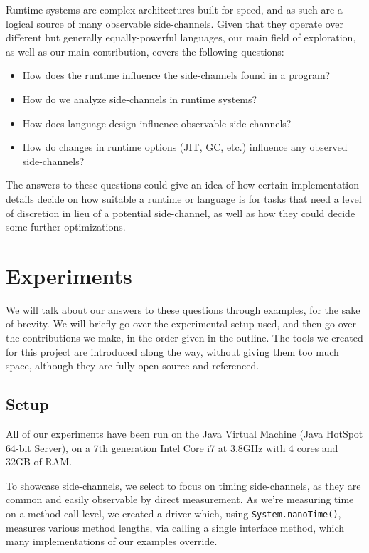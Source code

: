 \documentclass{article}
\begin{document}
Runtime systems are complex architectures built for speed, and as such are a
logical source of many observable side-channels. Given that they operate over
different but generally equally-powerful languages, our main field of
exploration, as well as our main contribution, covers the following questions:
\begin{itemize}     
	\item{How does the runtime influence the side-channels found in a program?}
	\item{How do we analyze side-channels in runtime systems?}
	\item{How does language design influence observable side-channels?}
	\item{How do changes in runtime options (JIT, GC, etc.) influence any 
		observed side-channels?}
\end{itemize}

The answers to these questions could give an idea of how certain implementation
details decide on how suitable a runtime or language is for tasks that need a level
of discretion in lieu of a potential side-channel, as well as how they could 
decide some further optimizations.

\section{Experiments}

We will talk about our answers to these questions through examples, for the sake of 
brevity. We will briefly go over the experimental setup used, and then go over the 
contributions we make, in the order given in the outline. The tools we created for this
project are introduced along the way, without giving them too much space, although they
are fully open-source and referenced.

\subsection{Setup}

All of our experiments have been run on the Java Virtual Machine (Java HotSpot 
64-bit Server), on a 7th generation Intel Core i7 at 3.8GHz with 4 cores and 32GB of RAM.

To showcase side-channels, we select to focus on timing side-channels, as they are common
and easily observable by direct measurement. As we're measuring time on a method-call level, 
we created a driver which, using \texttt{System.nanoTime()}, measures various method lengths,
via calling a single interface method, which many implementations of our examples override. 
\end{document}
